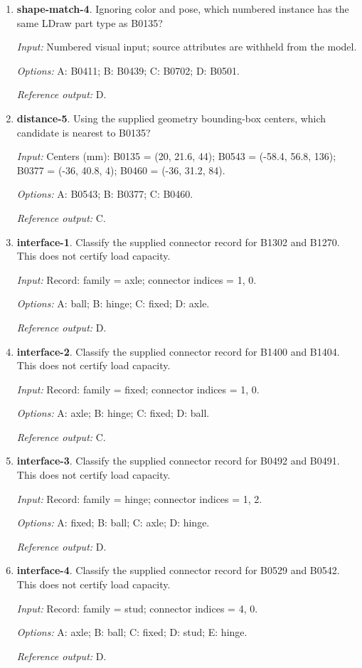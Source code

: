 \begin{enumerate}
\item \textbf{shape-match-4}. Ignoring color and pose, which numbered instance has the same LDraw part type as B0135?\par {\small \textit{Input:} Numbered visual input; source attributes are withheld from the model. \par\textit{Options:} A: B0411; B: B0439; C: B0702; D: B0501. \par\textit{Reference output:} D.}
\item \textbf{distance-5}. Using the supplied geometry bounding-box centers, which candidate is nearest to B0135?\par {\small \textit{Input:} Centers (mm): B0135 = (20, 21.6, 44); B0543 = (-58.4, 56.8, 136); B0377 = (-36, 40.8, 4); B0460 = (-36, 31.2, 84). \par\textit{Options:} A: B0543; B: B0377; C: B0460. \par\textit{Reference output:} C.}
\item \textbf{interface-1}. Classify the supplied connector record for B1302 and B1270. This does not certify load capacity.\par {\small \textit{Input:} Record: family = axle; connector indices = 1, 0. \par\textit{Options:} A: ball; B: hinge; C: fixed; D: axle. \par\textit{Reference output:} D.}
\item \textbf{interface-2}. Classify the supplied connector record for B1400 and B1404. This does not certify load capacity.\par {\small \textit{Input:} Record: family = fixed; connector indices = 1, 0. \par\textit{Options:} A: axle; B: hinge; C: fixed; D: ball. \par\textit{Reference output:} C.}
\item \textbf{interface-3}. Classify the supplied connector record for B0492 and B0491. This does not certify load capacity.\par {\small \textit{Input:} Record: family = hinge; connector indices = 1, 2. \par\textit{Options:} A: fixed; B: ball; C: axle; D: hinge. \par\textit{Reference output:} D.}
\item \textbf{interface-4}. Classify the supplied connector record for B0529 and B0542. This does not certify load capacity.\par {\small \textit{Input:} Record: family = stud; connector indices = 4, 0. \par\textit{Options:} A: axle; B: ball; C: fixed; D: stud; E: hinge. \par\textit{Reference output:} D.}

\end{enumerate}
